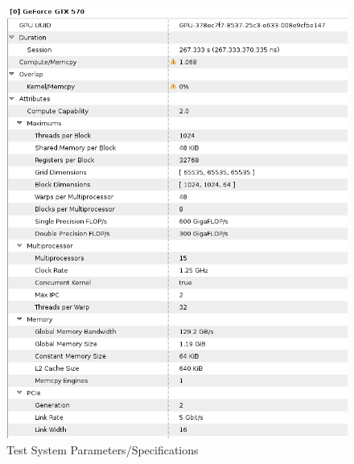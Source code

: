 \documentclass[a4paper]{article}
\begin{document}
\begin{figure}[H]
\begin{center}
\includegraphics[scale=0.5]{images/GPU_properties.PNG}
\caption{Test System Parameters/Specifications}
\label{fig:gpu}
\end{center}
\end{figure}
\end{document}
